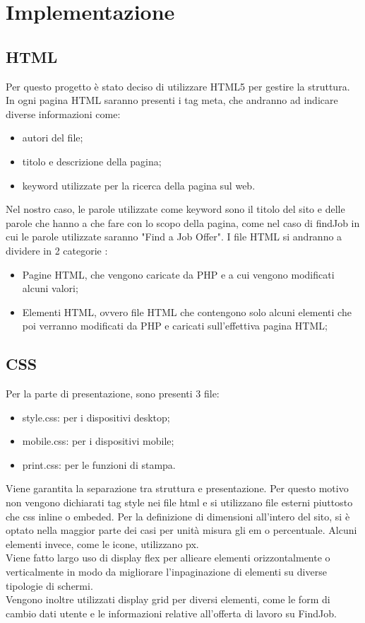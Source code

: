 \section{Implementazione}
	

  \subsection{HTML}
  Per questo progetto è stato deciso di utilizzare HTML5 per gestire la struttura. \\
  In ogni pagina HTML saranno presenti i tag meta, che andranno ad indicare diverse informazioni come:
  \begin{itemize}
    \item autori del file;
    \item titolo e descrizione della pagina;
    \item keyword utilizzate per la ricerca della pagina sul web.
  \end{itemize}
  Nel nostro caso, le parole utilizzate come keyword sono il titolo del sito e delle parole che hanno a che fare con lo scopo della pagina, come nel caso di findJob in cui le parole utilizzate saranno "Find a Job Offer".
  I file HTML si andranno a dividere in 2 categorie :
  \begin{itemize}
    \item Pagine HTML, che vengono caricate da PHP e a cui vengono modificati alcuni valori;
    \item Elementi HTML, ovvero file HTML che contengono solo alcuni elementi che poi verranno modificati da PHP e caricati sull'effettiva pagina HTML;
  \end{itemize}

  
  \subsection{CSS}
  Per la parte di presentazione, sono presenti 3 file:
  \begin{itemize}
    \item style.css: per i dispositivi desktop;
    \item mobile.css: per i dispositivi mobile;
    \item print.css: per le funzioni di stampa.
  \end{itemize}
  Viene garantita la separazione tra struttura e presentazione. Per questo motivo non vengono dichiarati tag style nei file html e si utilizzano file esterni piuttosto che css inline o embeded.
  Per la definizione di dimensioni all'intero del sito, si è optato nella maggior parte dei casi per unità misura gli em o percentuale. Alcuni elementi invece, come le icone, utilizzano px.\\
  Viene fatto largo uso di display flex per allieare elementi orizzontalmente o verticalmente in modo da migliorare l'inpaginazione di elementi su diverse tipologie di schermi. \\
  Vengono inoltre utilizzati display grid per diversi elementi, come le form di cambio dati utente e le informazioni relative all'offerta di lavoro su FindJob.
  
